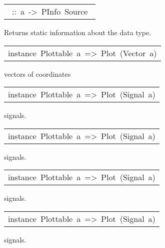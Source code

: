 \begin{haddockdesc}
\begin{haddockdesc}
\item[\begin{tabular}{@{}l}\haddockid{getInfo}\ ::\ a\ ->\ PInfo\ Source\ \end{tabular}]
\haddockbegindoc
Returns static information about the data type.\par

\end{haddockdesc}


\item[\begin{tabular}{@{}l}
instance\ Plottable\ a\ =>\ Plot\ (Vector\ a)
\end{tabular}]\haddockbegindoc
vectors of coordinates\par


\item[\begin{tabular}{@{}l}
instance\ Plottable\ a\ =>\ Plot\ (Signal\ a)
\end{tabular}]\haddockbegindoc
{} signals.\par


\item[\begin{tabular}{@{}l}
instance\ Plottable\ a\ =>\ Plot\ (Signal\ a)
\end{tabular}]\haddockbegindoc
{} signals.\par


\item[\begin{tabular}{@{}l}
instance\ Plottable\ a\ =>\ Plot\ (Signal\ a)
\end{tabular}]\haddockbegindoc
{} signals.\par


\item[\begin{tabular}{@{}l}
instance\ Plottable\ a\ =>\ Plot\ (Signal\ a)
\end{tabular}]\haddockbegindoc
{} signals.\par



\end{haddockdesc}
